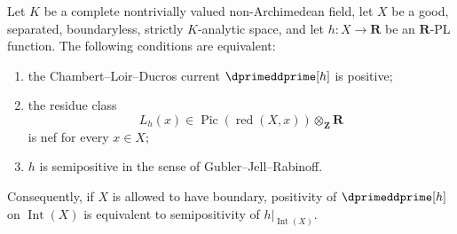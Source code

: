 \begin{theorem}
\label{thm:p01-real-pl-positive-current-candidate}
Let $K$ be a complete nontrivially valued non-Archimedean field, let $X$
be a good, separated, boundaryless, strictly $K$-analytic space, and let
$h:X\to\mathbf R$ be an $\mathbf R$-PL function.  The following conditions
are equivalent:
\begin{enumerate}
\item the Chambert--Loir--Ducros current
      $\dprimeddprime[h]$ is positive;
\item the residue class
      \[
      L_h(x)\in\operatorname{Pic}(\operatorname{red}(X,x))
                    \otimes_{\mathbf Z}\mathbf R
      \]
      is nef for every $x\in X$;
\item $h$ is semipositive in the sense of Gubler--Jell--Rabinoff.
\end{enumerate}
Consequently, if $X$ is allowed to have boundary, positivity of
$\dprimeddprime[h]$ on $\operatorname{Int}(X)$ is equivalent to
semipositivity of $h|_{\operatorname{Int}(X)}$.
\end{theorem}

